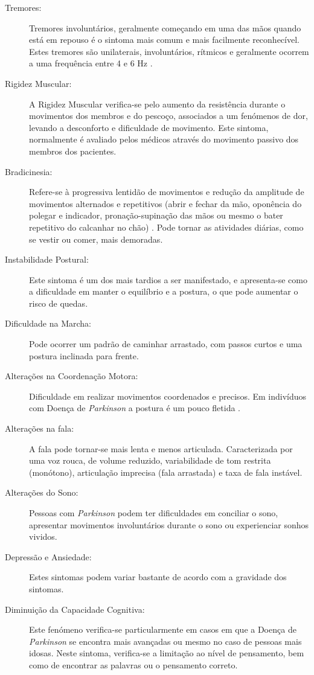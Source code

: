 \documentclass[12pt,a4paper,twoside]{report}
\begin{document}
{\begin{description}
  \item[Tremores:] Tremores involuntários, geralmente começando em uma das mãos quando está em repouso é o sintoma mais comum e mais facilmente reconhecível. Estes tremores são unilaterais, involuntários, rítmicos e geralmente ocorrem a uma frequência entre 4 e 6 Hz \cite{Cabreira_Massano_2019}.
  \item[Rigidez Muscular:] A Rigidez Muscular verifica-se pelo aumento da resistência durante o movimentos dos membros e do pescoço, associados a um fenómenos de dor, levando a desconforto e dificuldade de movimento. Este sintoma, normalmente é avaliado pelos médicos através do movimento passivo dos membros dos pacientes.
  \item[Bradicinesia:] Refere-se à progressiva lentidão de movimentos e redução da amplitude de movimentos alternados e repetitivos (abrir e fechar da mão, oponência do polegar e indicador, pronação-supinação das mãos ou mesmo o bater repetitivo do calcanhar no chão) \cite{Cabreira_Massano_2019}. Pode tornar as atividades diárias, como se vestir ou comer, mais demoradas.
  \item[Instabilidade Postural:] Este sintoma é um dos mais tardios a ser manifestado, e  apresenta-se como a dificuldade em manter o equilíbrio e a postura, o que pode aumentar o risco de quedas.
  \item[Dificuldade na Marcha:] Pode ocorrer um padrão de caminhar arrastado, com passos curtos e uma postura inclinada para frente.
  \item[Alterações na Coordenação Motora:] Dificuldade em realizar movimentos coordenados e precisos. Em indivíduos com Doença de \textit{Parkinson} a postura é um pouco fletida \cite{Cabreira_Massano_2019}.
  \item[Alterações na fala:] A fala pode tornar-se mais lenta e menos articulada. Caracterizada por uma voz rouca, de volume reduzido, variabilidade de tom restrita (monótono), articulação imprecisa (fala arrastada) e taxa de fala instável.
  \item[Alterações do Sono:] Pessoas com \textit{Parkinson} podem ter dificuldades em conciliar o sono, apresentar movimentos involuntários durante o sono ou experienciar sonhos vividos.
  \item[Depressão e Ansiedade:] Estes sintomas podem variar bastante de acordo com a gravidade dos sintomas.
  \item[Diminuição da Capacidade Cognitiva:] Este fenómeno verifica-se particularmente em casos em que a Doença de \textit{Parkinson} se encontra mais avançadas ou mesmo no caso de pessoas mais idosas. Neste sintoma, verifica-se a limitação ao nível de pensamento, bem como de encontrar as palavras ou o pensamento correto. 
\end{description}

}
\end{document}
